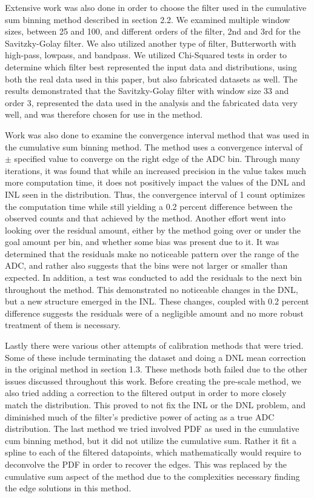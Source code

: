 \documentclass[11pt, letterpaper]{article}
\begin{document}
Extensive work was also done in order to choose the filter used in the cumulative sum binning method described in section 2.2. 
We examined multiple window sizes, between 25 and 100, and different orders of the filter, 2nd and 3rd for the Savitzky-Golay filter. 
We also utilized another type of filter, Butterworth with high-pass, lowpass, and bandpass. 
We utilized Chi-Squared tests in order to determine which filter best represented the input data and distributions, using both the real data used in this paper, but also fabricated datasets as well. 
The results demonstrated that the Savitzky-Golay filter with window size 33 and order 3, represented the data used in the analysis and the fabricated data very well, and was therefore chosen for use in the method. 
 \indent 

Work was also done to examine the convergence interval method that was used in the cumulative sum binning method. 
The method uses a convergence interval of $\pm$ specified value to converge on the right edge of the ADC bin. 
Through many iterations, it was found that while an increased precision in the value takes much more computation time, it does not positively impact the values of the DNL and INL seen in the distribution. 
Thus, the convergence interval of 1 count optimizes the computation time while still yielding a 0.2 percent difference between the observed counts and that achieved by the method. 
Another effort went into looking over the residual amount, either by the method going over or under the goal amount per bin, and whether some bias was present due to it. 
It was determined that the residuals make no noticeable pattern over the range of the ADC, and rather also suggests that the bins were not larger or smaller than expected. 
In addition, a test was conducted to add the residuals to the next bin throughout the method. 
This demonstrated no noticeable changes in the DNL, but a new structure emerged in the INL. 
These changes, coupled with 0.2 percent difference suggests the residuals were of a negligible amount and no more robust treatment of them is necessary. 
\indent 


Lastly there were various other attempts of calibration methods that were tried. 
Some of these include terminating the dataset and doing a DNL mean correction in the original method in section 1.3. 
These methods both failed due to the other issues discussed throughout this work. 
Before creating the pre-scale method, we also tried adding a correction to the filtered output in order to more closely match the distribution. 
This proved to not fix the INL or the DNL problem, and diminished much of the filter's predictive power of acting as a true ADC distribution.
The last method we tried involved PDF as used in the cumulative cum binning method, but it did not utilize the cumulative sum. 
Rather it fit a spline to each of the filtered datapoints, which mathematically would require to deconvolve the PDF in order to recover the edges. 
This was replaced by the cumulative sum aspect of the method due to the complexities necessary finding the edge solutions in this method. 
\end{document}
